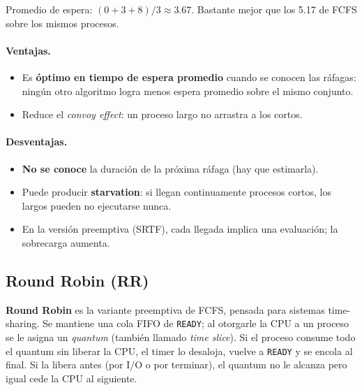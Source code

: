 \documentclass[11pt,a4paper]{article}
\begin{document}
Promedio de espera: $(0 + 3 + 8)/3 \approx 3.67$. Bastante mejor que
los 5.17 de FCFS sobre los mismos procesos.

\paragraph{Ventajas.}
\begin{itemize}[leftmargin=*,nosep]
    \item Es \textbf{óptimo en tiempo de espera promedio} cuando se
        conocen las ráfagas: ningún otro algoritmo logra menos espera
        promedio sobre el mismo conjunto.
    \item Reduce el \emph{convoy effect}: un proceso largo no
        arrastra a los cortos.
\end{itemize}

\paragraph{Desventajas.}
\begin{itemize}[leftmargin=*,nosep]
    \item \textbf{No se conoce} la duración de la próxima ráfaga (hay
        que estimarla).
    \item Puede producir \textbf{starvation}: si llegan continuamente
        procesos cortos, los largos pueden no ejecutarse nunca.
    \item En la versión preemptiva (SRTF), cada llegada implica una
        evaluación; la sobrecarga aumenta.
\end{itemize}

\subsection{Round Robin (RR)}

\begin{definicion}
\textbf{Round Robin} es la variante preemptiva de FCFS, pensada para
sistemas time-sharing. Se mantiene una cola FIFO de \texttt{READY}; al
otorgarle la CPU a un proceso se le asigna un \emph{quantum} (también
llamado \emph{time slice}). Si el proceso consume todo el quantum sin
liberar la CPU, el timer lo desaloja, vuelve a \texttt{READY} y se
encola al final. Si la libera antes (por I/O o por terminar), el
quantum no le alcanza pero igual cede la CPU al siguiente.
\end{definicion}
\end{document}
